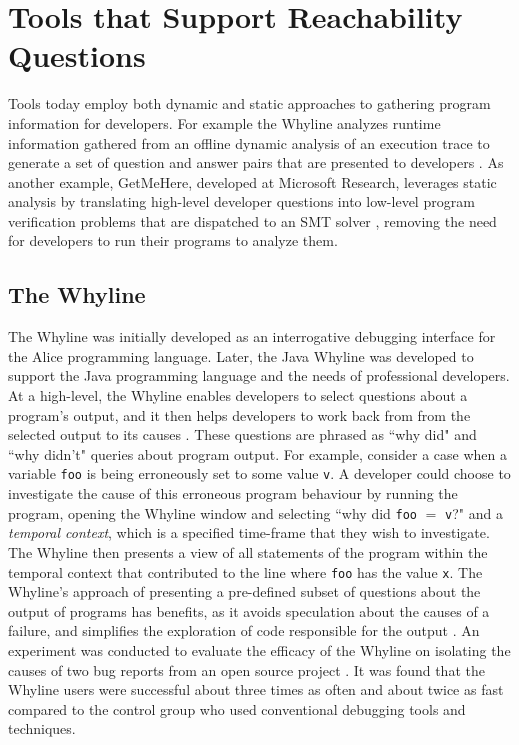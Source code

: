 \section{Tools that Support Reachability Questions}
\label{sec:ToolsSupportReachabilityQuestions}

\noindent Tools today employ both dynamic and static approaches to gathering
program information for developers.
For example the Whyline analyzes runtime information gathered from an offline 
dynamic analysis of an execution trace to generate a set of question and answer 
pairs that are presented to developers \cite{ko-2004-whyline}.
As another example, GetMeHere, developed at Microsoft Research, leverages static 
analysis by translating high-level developer questions into low-level program 
verification problems that are dispatched to an \ac{SMT} solver \cite{barnett-2014-get}, 
removing the need for developers to run their programs to analyze them.

\subsection{The Whyline}
\label{subsec:TheWhyline}

\par The Whyline was initially developed as an interrogative debugging interface
for the Alice programming language. Later, the Java Whyline \cite{ko-2009-java-whyline}
was developed to support the Java programming language and the needs of 
professional developers.
At a high-level, the Whyline enables developers to select questions about a
program's output, and it then helps developers to work back from from the 
selected output to its causes \cite{ko-2009-java-whyline}.
These questions are phrased as ``why did" and ``why didn't"
queries about program output.
For example, consider a case when a variable \texttt{foo} is being erroneously 
set to some value \texttt{v}.
A developer could choose to investigate the cause of this erroneous program
behaviour by running the program, opening the Whyline window and selecting
``why did \texttt{foo} $=$ \texttt{v}?" and a \emph{temporal context}, which is
a specified time-frame that they wish to investigate.
The Whyline then presents a view of all statements of the program within the
temporal context that contributed to the line where \texttt{foo} has the value
\texttt{x}. 
The Whyline's approach of presenting a pre-defined subset of questions about the 
output of programs has benefits, as it avoids speculation about the causes of
a failure, and simplifies the exploration of code responsible for the output
\cite{ko-2009-java-whyline}.
An experiment was conducted to evaluate the efficacy of the Whyline on 
isolating the causes of two bug reports from an open source project \cite{2009-ko-java-whyline}.
It was found that the Whyline users were successful about three times as often
and about twice as fast compared to the control group who used conventional
debugging tools and techniques.

